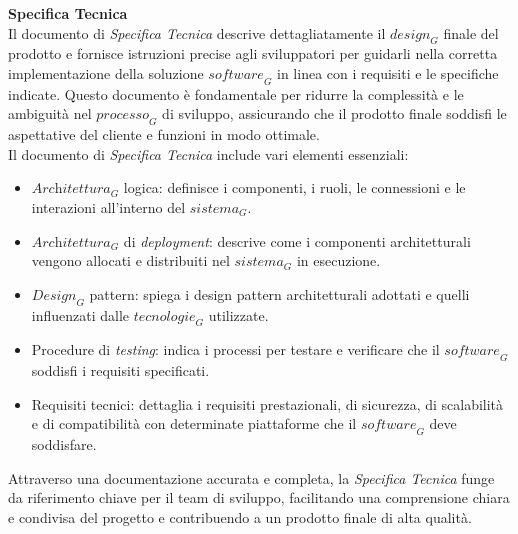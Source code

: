 \textbf{Specifica Tecnica}
\\
Il documento di \textit{Specifica Tecnica} descrive dettagliatamente il $\textit{design}_G$ finale del prodotto e fornisce istruzioni precise agli sviluppatori per guidarli nella corretta implementazione della soluzione $\textit{software}_G$ in linea con i requisiti e le specifiche indicate. Questo documento è fondamentale per ridurre la complessità e le ambiguità nel $\textit{processo}_G$ di sviluppo, assicurando che il prodotto finale soddisfi le aspettative del cliente e funzioni in modo ottimale.
\\
Il documento di \textit{Specifica Tecnica} include vari elementi essenziali:
\begin{itemize}
\item $\textit{Architettura}_G$ logica: definisce i componenti, i ruoli, le connessioni e le interazioni all'interno del $\textit{sistema}_G$.
\item $\textit{Architettura}_G$ di \textit{deployment}: descrive come i componenti architetturali vengono allocati e distribuiti nel $\textit{sistema}_G$ in esecuzione.
\item $\textit{Design}_G$ pattern: spiega i design pattern architetturali adottati e quelli influenzati dalle $\textit{tecnologie}_G$ utilizzate.
\item Procedure di \textit{testing}: indica i processi per testare e verificare che il $\textit{software}_G$ soddisfi i requisiti specificati.
\item Requisiti tecnici: dettaglia i requisiti prestazionali, di sicurezza, di scalabilità e di compatibilità con determinate piattaforme che il $\textit{software}_G$ deve soddisfare.
\end{itemize}
Attraverso una documentazione accurata e completa, la \textit{Specifica Tecnica} funge da riferimento chiave per il team di sviluppo, facilitando una comprensione chiara e condivisa del progetto e contribuendo a un prodotto finale di alta qualità.


